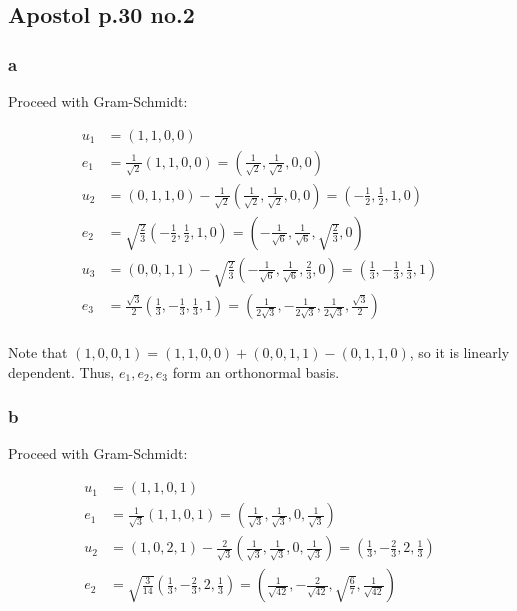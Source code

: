 \documentclass[12pt,letterpaper]{article}
\theoremstyle{definition}
\begin{document}
\subsection*{Apostol p.30 no.2}

\subsubsection*{a}

Proceed with Gram-Schmidt:

\begin{align*}
  u_1 &= (1, 1, 0, 0) \\
  e_1 &= \frac{1}{\sqrt{2}}(1, 1, 0, 0) = (\frac{1}{\sqrt{2}}, \frac{1}{\sqrt{2}}, 0, 0)\\
  u_2 &= (0, 1, 1, 0) - \frac{1}{\sqrt{2}}(\frac{1}{\sqrt{2}}, \frac{1}{\sqrt{2}}, 0, 0) = (-\frac{1}{2}, \frac{1}{2}, 1, 0)\\
  e_2 &= \sqrt{\frac{2}{3}}(-\frac{1}{2}, \frac{1}{2}, 1, 0) = (-\frac{1}{\sqrt{6}}, \frac{1}{\sqrt{6}}, \sqrt{\frac{2}{3}}, 0) \\
  u_3 &= (0,0,1,1) - \sqrt{\frac{2}{3}}(-\frac{1}{\sqrt{6}}, \frac{1}{\sqrt{6}}, \frac{2}{3}, 0) = (\frac{1}{3}, -\frac{1}{3}, \frac{1}{3}, 1)\\
  e_3 &= \frac{\sqrt{3}}{2}(\frac{1}{3}, -\frac{1}{3}, \frac{1}{3}, 1) = (\frac{1}{2\sqrt{3}}, -\frac{1}{2\sqrt{3}}, \frac{1}{2\sqrt{3}}, \frac{\sqrt{3}}{2}) \\
\end{align*}

Note that $(1, 0,0,1) = (1,1,0,0) + (0,0,1,1) - (0,1,1,0)$, so it is linearly
dependent. Thus, $e_1, e_2, e_3$ form an orthonormal basis.

\subsubsection*{b}

Proceed with Gram-Schmidt:

\begin{align*}
  u_1 &= (1, 1, 0, 1) \\
  e_1 &= \frac{1}{\sqrt{3}}(1,1,0,1) = (\frac{1}{\sqrt{3}}, \frac{1}{\sqrt{3}}, 0, \frac{1}{\sqrt{3}}) \\
  u_2 &= (1,0,2,1) - \frac{2}{\sqrt{3}}(\frac{1}{\sqrt{3}}, \frac{1}{\sqrt{3}}, 0, \frac{1}{\sqrt{3}}) = (\frac{1}{3}, -\frac{2}{3}, 2, \frac{1}{3})\\
  e_2 &= \sqrt{\frac{3}{14}}(\frac{1}{3}, -\frac{2}{3}, 2, \frac{1}{3}) = (\frac{1}{\sqrt{42}}, -\frac{2}{\sqrt{42}}, \sqrt{\frac{6}{7}}, \frac{1}{\sqrt{42}})
\end{align*}
\end{document}
